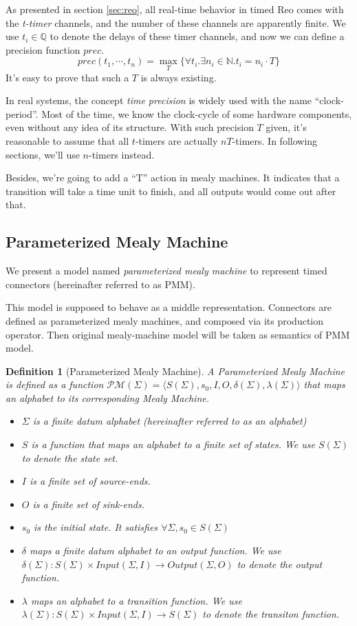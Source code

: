 \documentclass[conference, a4paper]{IEEEtran}
\newtheorem{definition}{Definition}
\begin{document}
As presented in section \ref{sec:reo}, all real-time behavior in timed Reo comes with the
\emph{t-timer} channels, and the number of these channels are apparently finite. We use
$t_i\in\mathbb{Q}$ to denote the delays of these timer channels, and now we can define a precision
function $prec$.
\[
prec(t_1,\cdots,t_n) = \max_T\{\forall t_i.\exists n_i\in\mathbb{N}.t_i=n_i\cdot T\}
\]
It's easy to prove that such a $T$ is always existing.

In real systems, the concept \emph{time precision} is widely used with the name ``clock-period''.
Most of the time, we know the clock-cycle of some hardware components, even without any idea of its
structure. With such precision $T$ given, it's reasonable to assume that all $t$-timers are actually
$nT$-timers. In following sections, we'll use $n$-timers instead.

Besides, we're going to add a ``T'' action in mealy machines. It indicates that a transition
will take a time unit to finish, and all outputs would come out after that.

\subsection{Parameterized Mealy Machine}
We present a model named \emph{parameterized mealy machine} to represent timed connectors
(hereinafter referred to as PMM). 

This model is supposed to behave as a middle representation. Connectors are defined as parameterized
mealy machines, and composed via its production operator. Then original mealy-machine model will be
taken as semantics of PMM model.

\begin{definition}[Parameterized Mealy Machine]
  A \emph{Parameterized Mealy Machine} is defined as a function $\mathcal{PM}(\Sigma)=\langle
  S(\Sigma), s_0, I, O, \delta(\Sigma), \lambda(\Sigma)\rangle$ that maps an
  alphabet to its corresponding Mealy Machine. 
  \begin{itemize}
    \item[-] $\Sigma$ is a \emph{finite} datum alphabet (hereinafter referred to as an alphabet)
    \item[-] $S$ is a function that maps an alphabet to a \emph{finite} set of
      states. We use $S(\Sigma)$ to denote the state set.
    \item[-] $I$ is a finite set of source-ends.
    \item[-] $O$ is a finite set of sink-ends.
    \item[-] $s_0$ is the initial state. It satisfies $\forall \Sigma,s_0\in S(\Sigma)$
    \item[-] $\delta$ maps a \emph{finite} datum alphabet to an \emph{output function}. We use
      $\delta(\Sigma):S(\Sigma)\times Input(\Sigma,I)\rightarrow Output(\Sigma, O)$ to denote the output function.
    \item[-] $\lambda$ maps an alphabet to a \emph{transition function}. We use
      $\lambda(\Sigma):S(\Sigma)\times Input(\Sigma,I)\rightarrow S(\Sigma)$ to denote the transiton
      function.
  \end{itemize}
\end{definition}
\end{document}

